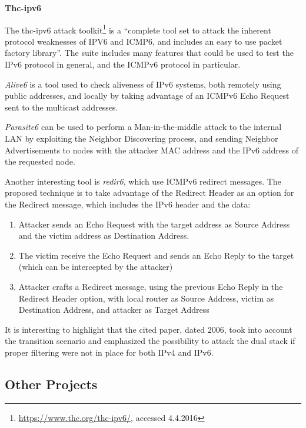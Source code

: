 \documentclass[12pt]{article}
\begin{document}
\textbf{Thc-ipv6}

The thc-ipv6 attack toolkit\footnote{\url{https://www.thc.org/thc-ipv6/}, accessed 4.4.2016} is a ``complete tool set to attack the inherent protocol weaknesses of IPV6 and ICMP6, and includes an easy to use packet factory library''. The suite includes many features that could be used to test the IPv6 protocol in general, and the ICMPv6 protocol in particular\cite{thc}.

\textit{Alive6} is a tool used to check aliveness of IPv6 systems, both remotely using public addresses, and locally by taking advantage of an ICMPv6 Echo Request sent to the multicast addresses\cite{thc}.

\textit{Parasite6} can be used to perform a Man-in-the-middle attack to the internal LAN by exploiting the Neighbor Discovering process, and sending Neighbor Advertisements to nodes with the attacker MAC address and the IPv6 address of the requested node\cite{thc}.

Another interesting tool is \textit{redir6}, which use ICMPv6 redirect messages. The proposed technique is to take advantage of the Redirect Header as an option for the Redirect message, which includes the IPv6 header and the data\cite{thc}:
\vspace{-15pt}
\begin{enumerate}[noitemsep,topsep=0pt,partopsep=0pt]
 \item Attacker sends an Echo Request with the target address as Source Address and the victim address as Destination Address.
 \item The victim receive the Echo Request and sends an Echo Reply to the target (which can be intercepted by the attacker)
 \item Attacker crafts a Redirect message, using the previous Echo Reply in the Redirect Header option, with local router as Source Address, victim as Destination Address, and attacker as Target Address
\end{enumerate}

It is interesting to highlight that the cited paper, dated 2006, took into account the transition scenario and emphasized the possibility to attack the dual stack if proper filtering were not in place for both IPv4 and IPv6.


\subsection{Other Projects}
\label{sub:otherProj}
\end{document}
